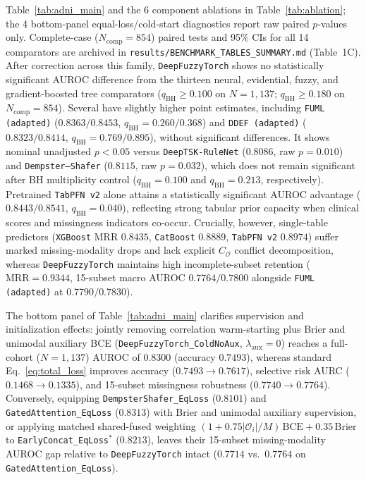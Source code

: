 \documentclass[10pt,twocolumn]{article}
\begin{document}
Table~\ref{tab:adni_main} and the 6 component ablations in Table~\ref{tab:ablation}; the 4
bottom-panel equal-loss/cold-start diagnostics report raw paired $p$-values only. Complete-case
($N_{\text{comp}}=854$) paired tests and 95\% CIs for all 14 comparators are archived in
\texttt{results/\allowbreak BENCHMARK\_\allowbreak TABLES\_\allowbreak SUMMARY.md} (Table~1C).
After correction across this family,
\texttt{DeepFuzzyTorch} shows no statistically significant AUROC difference from the thirteen
neural, evidential, fuzzy, and gradient-boosted tree comparators ($q_{\text{BH}}\ge 0.100$ on
$N=1,137$; $q_{\text{BH}}\ge 0.180$ on $N_{\text{comp}}=854$). Several have slightly higher
point estimates, including \texttt{FUML (adapted)} ($0.8363/0.8453$,
$q_{\text{BH}}=0.260/0.368$) and \texttt{DDEF (adapted)} ($0.8323/0.8414$,
$q_{\text{BH}}=0.769/0.895$), without significant differences. It shows nominal unadjusted
$p<0.05$ versus \texttt{DeepTSK-RuleNet} ($0.8086$, raw $p=0.010$) and
\texttt{Dempster--Shafer} ($0.8115$, raw $p=0.032$), which does not remain significant after
BH multiplicity control ($q_{\text{BH}}=0.100$ and $q_{\text{BH}}=0.213$, respectively).
Pretrained \texttt{TabPFN~v2} alone attains a statistically significant AUROC advantage
($0.8443/0.8541$, $q_{\text{BH}}=0.040$), reflecting strong tabular prior capacity when
clinical scores and missingness indicators co-occur. Crucially, however,
single-table predictors (\texttt{XGBoost} MRR $0.8435$, \texttt{CatBoost} $0.8889$,
\texttt{TabPFN~v2} $0.8974$) suffer marked missing-modality drops and lack explicit
$C_{\mathcal{O}}$
conflict decomposition, whereas \texttt{DeepFuzzyTorch} maintains high incomplete-subset
retention ($\text{MRR}=0.9344$, 15-subset macro AUROC $0.7764 / 0.7800$ alongside
\texttt{FUML (adapted)} at $0.7790 / 0.7830$).

The bottom panel of Table~\ref{tab:adni_main} clarifies supervision and initialization effects:
jointly removing correlation warm-starting plus Brier and unimodal auxiliary BCE
(\texttt{DeepFuzzyTorch\_ColdNoAux}, $\lambda_{\text{aux}}=0$) reaches a full-cohort
($N=1,137$) AUROC of $0.8300$ (accuracy $0.7493$), whereas standard Eq.~\eqref{eq:total_loss}
improves accuracy ($0.7493 \to 0.7617$), selective risk AURC ($0.1468 \to 0.1335$), and
15-subset missingness robustness ($0.7740 \to 0.7764$). Conversely, equipping
\texttt{DempsterShafer\_EqLoss} ($0.8101$) and \texttt{GatedAttention\_EqLoss} ($0.8313$) with
Brier and unimodal auxiliary supervision, or applying matched shared-fused weighting
$(1+0.75|\mathcal{O}_i|/M)\,\text{BCE}+0.35\,\text{Brier}$ to \texttt{EarlyConcat\_EqLoss}$^*$
($0.8213$), leaves their 15-subset missing-modality AUROC gap relative to
\texttt{DeepFuzzyTorch}
intact ($0.7714$ vs.\ $0.7764$ on \texttt{GatedAttention\_EqLoss}).
\end{document}
